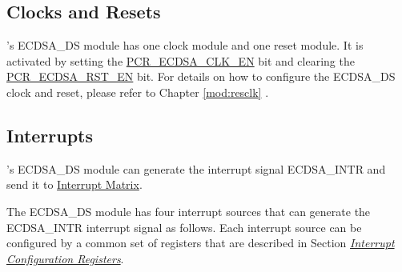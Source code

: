 \documentclass[main\_\_EN.tex]{subfiles}
\begin{document}
\subsection{Clocks and Resets}

\chipname{}'s ECDSA\_DS module has one clock module and one reset module. It is activated by setting the \hyperref[fielddesc:PCRECDSACLKEN]{PCR\_ECDSA\_CLK\_EN} bit and clearing the \hyperref[fielddesc:PCRECDSARSTEN]{PCR\_ECDSA\_RST\_EN} bit. For details on how to configure the ECDSA\_DS clock and reset, please refer to Chapter \ref{mod:resclk} \textit{}.

\subsection{Interrupts}
\label{sec:ecdsa-interrupt}

\chipname{}'s ECDSA\_DS module can generate the interrupt signal ECDSA\_INTR and send it to \hyperref[mod:intmtrx]{Interrupt Matrix}.

The ECDSA\_DS module has four interrupt sources that can generate the ECDSA\_INTR interrupt signal as follows. Each interrupt source can be configured by a common set of registers that are described in Section \hyperref[interrupt-config-registers]{\textit{Interrupt Configuration Registers}}.
\end{document}
